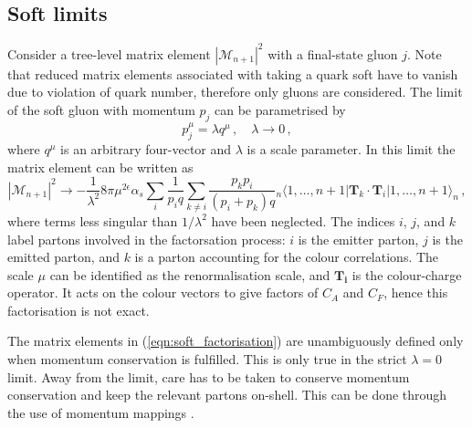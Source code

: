 \documentclass[main.tex]{subfiles}
\begin{document}
\subsection{Soft limits}\label{sec:me_soft}
    Consider a tree-level matrix element $|\mathcal{M}_{n+1}|^{2}$
    with a final-state gluon $j$. Note that reduced matrix
    elements associated with taking a quark soft have to vanish
    due to violation of quark number, therefore only gluons
    are considered.
    The limit of the soft gluon with momentum
    $p_{j}$ can be parametrised by
    \begin{equation}\label{eqn:soft_parametrisation}
        p_{j}^{\mu} = \lambda q^{\mu} \, , \quad \lambda \rightarrow 0 \, ,
    \end{equation}
    where $q^{\mu}$ is an arbitrary four-vector and $\lambda$
    is a scale parameter. In this limit the matrix element
    can be written as
    \begin{equation}\label{eqn:soft_factorisation}
        |\mathcal{M}_{n+1}|^{2} \rightarrow -\dfrac{1}{\lambda^{2}}8\pi \mu^{2\epsilon}\alpha_{s} \sum_{i}\dfrac{1}{p_{i}q}\sum_{k \neq i} \dfrac{p_{k}p_{i}}{(p_{i} + p_{k})q} {}_{n}\langle 1, \ldots, n+1 | \bm{T}_{k} \cdot \bm{T}_{i} | 1, \ldots, n+1 \rangle_{n} \, ,
    \end{equation}
    where terms less singular than $1 / \lambda^{2}$ have been
    neglected. The indices $i$, $j$, and $k$ label partons involved
    in the factorsation process: $i$ is the emitter parton,
    $j$ is the emitted parton, and $k$ is a parton accounting
    for the colour correlations. The scale $\mu$ can be identified as the
    renormalisation scale, and $\bm{T_{i}}$ is the colour-charge
    operator. It acts on the colour vectors to give factors of
    $C_{A}$ and $C_{F}$, hence this factorisation is not exact.

    The matrix elements in (\ref{eqn:soft_factorisation}) are
    unambiguously defined only when momentum conservation is
    fulfilled. This is only true in the strict $\lambda = 0$
    limit. Away from the limit, care has to be taken to conserve
    momentum conservation and keep the relevant partons on-shell.
    This can be done through the use of momentum mappings
    \cite{Catani:1996vz,Kosower:1997zr}.
\end{document}
